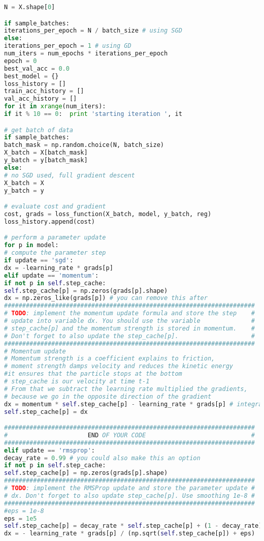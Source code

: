 \begin{lstlisting}[language=Python, label=lst:classifiertrainer.py, caption={classifier\_trainer.py}, basicstyle=\tiny]
N = X.shape[0]

if sample_batches:
iterations_per_epoch = N / batch_size # using SGD
else:
iterations_per_epoch = 1 # using GD
num_iters = num_epochs * iterations_per_epoch
epoch = 0
best_val_acc = 0.0
best_model = {}
loss_history = []
train_acc_history = []
val_acc_history = []
for it in xrange(num_iters):
if it % 10 == 0:  print 'starting iteration ', it

# get batch of data
if sample_batches:
batch_mask = np.random.choice(N, batch_size)
X_batch = X[batch_mask]
y_batch = y[batch_mask]
else:
# no SGD used, full gradient descent
X_batch = X
y_batch = y

# evaluate cost and gradient
cost, grads = loss_function(X_batch, model, y_batch, reg)
loss_history.append(cost)

# perform a parameter update
for p in model:
# compute the parameter step
if update == 'sgd':
dx = -learning_rate * grads[p]
elif update == 'momentum':
if not p in self.step_cache: 
self.step_cache[p] = np.zeros(grads[p].shape)
dx = np.zeros_like(grads[p]) # you can remove this after
#####################################################################
# TODO: implement the momentum update formula and store the step    #
# update into variable dx. You should use the variable              #
# step_cache[p] and the momentum strength is stored in momentum.    #
# Don't forget to also update the step_cache[p].                    #
#####################################################################
# Momentum update
# Momentum strength is a coefficient explains to friction,
# moment strength damps velocity and reduces the kinetic energy
#it ensures that the particle stops at the bottom
# step_cache is our velocity at time t-1
# From that we subtract the learning rate multiplied the gradients, 
# because we go in the opposite direction of the gradient
dx = momentum * self.step_cache[p] - learning_rate * grads[p] # integrate velocity
self.step_cache[p] = dx 

#####################################################################
#                      END OF YOUR CODE                             #
#####################################################################
elif update == 'rmsprop':
decay_rate = 0.99 # you could also make this an option
if not p in self.step_cache: 
self.step_cache[p] = np.zeros(grads[p].shape)
#####################################################################
# TODO: implement the RMSProp update and store the parameter update #
# dx. Don't forget to also update step_cache[p]. Use smoothing 1e-8 #
#####################################################################
#eps = 1e-8
eps = 1e5
self.step_cache[p] = decay_rate * self.step_cache[p] + (1 - decay_rate) * grads[p]**2
dx = - learning_rate * grads[p] / (np.sqrt(self.step_cache[p]) + eps)



\end{lstlisting}
